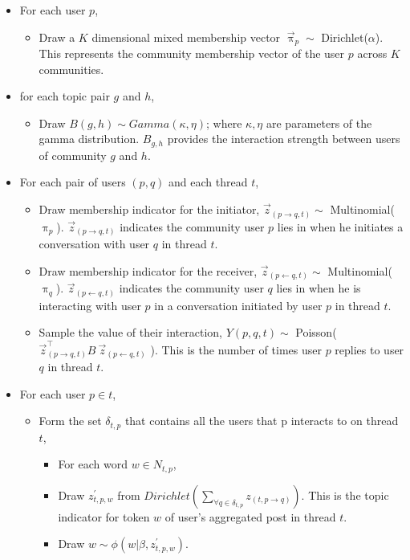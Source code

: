 \documentclass{sig-alternate}
\begin{document}
\begin{itemize}
  \item For each user $p $,
  \begin{itemize}
    \item Draw a $K$ dimensional mixed membership vector 
    $\overset{\rightarrow}{\uppi}_{p} \sim$ Dirichlet($\alpha$). 
	This represents the community membership vector of the user $p$
	across $K$ communities.
  \end{itemize}
  \item for each topic pair $g$ and $h$,
    \begin{itemize}
    \item Draw $B(g,h) \sim Gamma(\kappa,\eta)$; where $\kappa, \eta$ are
	parameters of the gamma distribution. $B_{g,h}$ provides the interaction
	strength between users of community $g$ and $h$.
  \end{itemize}

  \item For each pair of users $(p, q)$ and each thread $t$,
  \begin{itemize}
    \item Draw membership indicator for the initiator, 
    $\overset{\rightarrow}{z}_{(p \rightarrow q,t)} \sim$
    Multinomial($\uppi_{p}$). 
	$\overset{\rightarrow}{z}_{(p \rightarrow q,t)}$ indicates
	the community user $p$ lies in when he initiates a conversation
	with user $q$ in thread $t$.
    \item Draw membership indicator for the receiver,
    $\overset{\rightarrow}{z}_{(p \leftarrow q,t)} \sim$
    Multinomial($\uppi_{q}$).
	$\overset{\rightarrow}{z}_{(p \leftarrow q,t)}$ indicates the
	community user $q$ lies in when he is interacting with user $p$
	in a conversation initiated by user $p$ in thread $t$.
    \item Sample the value of their interaction, $Y(p,q,t) \sim$
    Poisson( ${\overset{\rightarrow}{z}}^{\top}_{(p \rightarrow q,t)}
    B~\overset{\rightarrow}{z}_{(p \leftarrow q,t)}$ ). This is 
	the number of times user $p$ replies to user $q$ in thread $t$.
	\end{itemize}
	\item For each user $p \in t$,
	\begin{itemize}
	  \item Form the set $\delta_{t,p}$ that contains all the users that p
	  interacts to on thread $t$,
	  \begin{itemize}
	    \item For each word $w \in N_{t,p}$, 
	    \item Draw $z^{'}_{t,p,w}$ from $Dirichlet(\sum_{\forall q\in \delta_{t,p}} z_{(t,p
	    \rightarrow q)})$. This is the topic indicator for token $w$ of user's aggregated
		post in thread $t$.
	    \item Draw $w \sim \phi(w|\beta,z^{'}_{t,p,w}) $.
	  \end{itemize}
  \end{itemize}
\end{itemize}  
\end{document}
